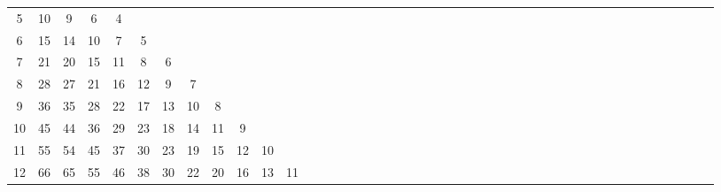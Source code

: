\documentclass[12pt,a4paper]{amsart}
\theoremstyle{definition} %
\theoremstyle{plain} %
\begin{document}
\begin{table}[h]
{\begin{tabular}{|c|*{44}{c|}}
            5 &  10 &   9 &   6 &   4 &     &     &     &     &     &      &      &      &      &      &      &      &      &      &      &      &      &      &      &      &      &      &      &      &      &      &      &      &      &      &      &      &      &      &      &      &      &      &      &      \\
            6 &  15 &  14 &  10 &   7 &   5 &     &     &     &     &      &      &      &      &      &      &      &      &      &      &      &      &      &      &      &      &      &      &      &      &      &      &      &      &      &      &      &      &      &      &      &      &      &      &      \\
            7 &  21 &  20 &  15 &  11 &   8 &   6 &     &     &     &      &      &      &      &      &      &      &      &      &      &      &      &      &      &      &      &      &      &      &      &      &      &      &      &      &      &      &      &      &      &      &      &      &      &      \\
            8 &  28 &  27 &  21 &  16 &  12 &   9 &   7 &     &     &      &      &      &      &      &      &      &      &      &      &      &      &      &      &      &      &      &      &      &      &      &      &      &      &      &      &      &      &      &      &      &      &      &      &      \\
            9 &  36 &  35 &  28 &  22 &  17 &  13 &  10 &   8 &     &      &      &      &      &      &      &      &      &      &      &      &      &      &      &      &      &      &      &      &      &      &      &      &      &      &      &      &      &      &      &      &      &      &      &      \\
            10 &  45 &  44 &  36 &  29 &  23 &  18 &  14 &  11 &   9 &      &      &      &      &      &      &      &      &      &      &      &      &      &      &      &      &      &      &      &      &      &      &      &      &      &      &      &      &      &      &      &      &      &      &      \\
            11 &  55 &  54 &  45 &  37 &  30 &  23 &  19 &  15 &  12 &   10 &      &      &      &      &      &      &      &      &      &      &      &      &      &      &      &      &      &      &      &      &      &      &      &      &      &      &      &      &      &      &      &      &      &      \\
            12 &  66 &  65 &  55 &  46 &  38 &  30 &  22 &  20 &  16 &   13 &   11 &      &      &      &      &      &      &      &      &      &      &      &      &      &      &      &      &      &      &      &      &      &      &      &      &      &      &      &      &      &      &      &      &      \\

\end{tabular}}
\end{table}
\end{document}
